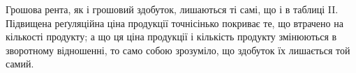 Грошова рента, як і грошовий здобуток, лишаються ті самі, що і в таблиці II.
Підвищена реґуляційна ціна продукції точнісінько покриває те, що втрачено
на кількості продукту; а що ця ціна продукції і кількість продукту змінюються
в зворотному відношенні, то само собою зрозуміло, що здобуток їх лишається
той самий.